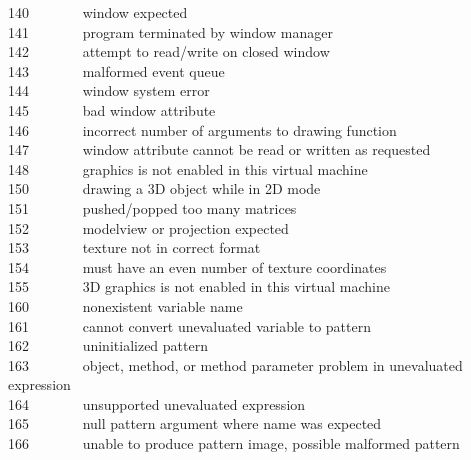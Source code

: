 140 \ \ \ \ \ \ \ window expected\\
141 \ \ \ \ \ \ \ program terminated by window manager\\
142 \ \ \ \ \ \ \ attempt to read/write on closed window\\
143 \ \ \ \ \ \ \ malformed event queue\\
144 \ \ \ \ \ \ \ window system error\\
145 \ \ \ \ \ \ \ bad window attribute\\
146 \ \ \ \ \ \ \ incorrect number of arguments to drawing
function\\
147 \ \ \ \ \ \ \ window attribute cannot be read or written as requested\\
148 \ \ \ \ \ \ \ graphics is not enabled in this virtual machine\\
150 \ \ \ \ \ \ \ drawing a 3D object while in 2D mode\\
151 \ \ \ \ \ \ \ pushed/popped too many matrices\\
152 \ \ \ \ \ \ \ modelview or projection expected\\
153 \ \ \ \ \ \ \ texture not in correct format\\
154 \ \ \ \ \ \ \ must have an even number of texture coordinates\\
155 \ \ \ \ \ \ \ 3D graphics is not enabled in this virtual machine\\
160 \ \ \ \ \ \ \ nonexistent variable name\\
161 \ \ \ \ \ \ \ cannot convert unevaluated variable to pattern\\
162 \ \ \ \ \ \ \ uninitialized pattern\\
163 \ \ \ \ \ \ \ object, method, or method parameter problem in
unevaluated expression\\
164 \ \ \ \ \ \ \ unsupported unevaluated expression\\
165 \ \ \ \ \ \ \ null pattern argument where name was expected\\
166 \ \ \ \ \ \ \ unable to produce pattern image, possible malformed pattern\\
